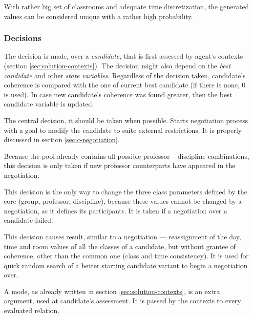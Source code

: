 \documentclass[../../ThesisDoc]{subfiles}
\begin{document}
\medskip

With rather big set of classrooms and adequate time discretization, the generated
values can be considered unique with a rather high probability.



\subsubsection{Decisions}

The decision is made, over a \emph{candidate}, that is first assessed by agent's contexts
(section \ref{sec:solution-contexts}). The decision might also depend on the
\emph{best candidate} and other \emph{state variables}.
Regardless of the decision taken, candidate's coherence is compared with the one
of current best candidate (if there is none, 0 is used). In case new candidate's
coherence was found greater, then the best candidate variable is updated.


\noindent
The central decision, it should be taken when possible. Starts negotiation process
with a goal to modify the candidate to suite external restrictions.
It is properly discussed in section \ref{sec:c-negotiation}.


\noindent
Because the pool already contains all possible professor -- discipline combinations,
this decision is only taken if new professor counterparts have appeared
in the negotiation.

\noindent
This decision is the only way to change the three class parameters
defined by the core (group, professor, discipline), because these values
cannot be changed by a negotiation, as it defines its participants.
It is taken if a negotiation over a candidate failed.

\noindent
This decision causes result, similar to a negotiation --- reassignment of
the day, time and room values of all the classes of a candidate, but without
grantee of coherence, other than the common one (class and time consistency).
It is used for quick random search of a better starting candidate variant to begin a
negotiation over.

\noindent
A mode, as already written in section \ref{sec:solution-contexts}, is an extra
argument, used at candidate's assessment. It is passed by the contexts to every
evaluated relation.
\end{document}
